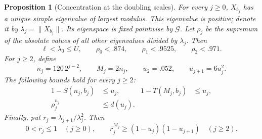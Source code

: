 \documentclass[11pt]{article}
\newtheorem{proposition}[theorem]{Proposition}
\theoremstyle{remark}
\numberwithin{equation}{section}
\begin{document}
\begin{proposition}[Concentration at the doubling scales]
\label{per:concentration}
For every $j\ge0$, $X_{b_j}$ has a unique simple eigenvalue of largest
modulus.  This eigenvalue is positive; denote it by
$\lambda_j=\|X_{b_j}\|$.  Its eigenspace is fixed pointwise by
$\mathcal G$.  Let $\rho_j$ be the supremum of the absolute values of
all other eigenvalues divided by $\lambda_j$.  Then
\begin{equation}\label{per:initial-ratios}
 \ell<\lambda_0\le U,\qquad
 \rho_0<.874,\qquad \rho_1<.9525,\qquad \rho_2<.971.
\end{equation}
For $j\ge2$, define
\begin{equation}\label{per:scales}
 n_j=120\,2^{j-2},\qquad M_j=2n_j,\qquad
 u_2=.052,\qquad u_{j+1}=6u_j^2.
\end{equation}
The following bounds hold for every $j\ge2$:
\begin{align}
 1-S(n_j,b_j)&\le u_j,&
 1-T(M_j,b_j)&\le u_j, \label{per:tracked-purities}\\
 \rho_j^{n_j}&\le d(u_j). &&\label{per:spectral-ratio}
\end{align}
Finally, put $r_j=\lambda_{j+1}/\lambda_j^2$.  Then
\begin{equation}\label{per:lambda-ratios}
 0<r_j\le1\quad(j\ge0),\qquad
 r_j^{M_j}\ge(1-u_j)(1-u_{j+1})\quad(j\ge2).
\end{equation}
\end{proposition}
\end{document}
